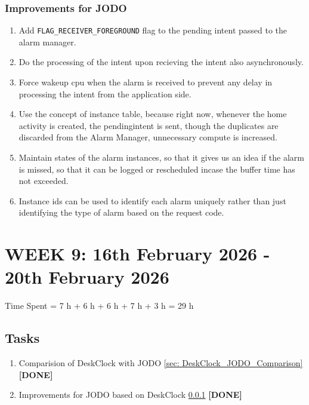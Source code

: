 \documentclass{article}
\begin{document}
\subsubsection{Improvements for JODO}
\label{sec: DeskClock_JODO_Improvements}
\begin{enumerate}
    \item Add \texttt{FLAG\_RECEIVER\_FOREGROUND} flag to the pending intent passed to the alarm manager.
    \item Do the processing of the intent upon recieving the intent also asynchronously.
    \item Force wakeup cpu when the alarm is received to prevent any delay in processing the intent from the application side.
    \item Use the concept of instance table, because right now, whenever the home activity is created, the pendingintent is sent, though the duplicates are discarded from the Alarm Manager, unnecessary compute is increased.
    \item Maintain states of the alarm instances, so that it gives us an idea if the alarm is missed, so that it can be logged or rescheduled incase the buffer time has not exceeded.
    \item Instance ids can be used to identify each alarm uniquely rather than just identifying the type of alarm based on the request code.
\end{enumerate}


\newpage
\section{WEEK 9: 16th February 2026 - 20th February 2026}

Time Spent = 7 h + 6 h + 6 h + 7 h + 3 h = 29 h

\subsection{Tasks}
\begin{enumerate}
    \item Comparision of DeskClock with JODO \ref{sec: DeskClock_JODO_Comparison} \hfill \textbf{[DONE]}
    \item Improvements for JODO based on DeskClock \ref{sec: DeskClock_JODO_Improvements} \hfill \textbf{[DONE]}
\end{enumerate}
\end{document}
